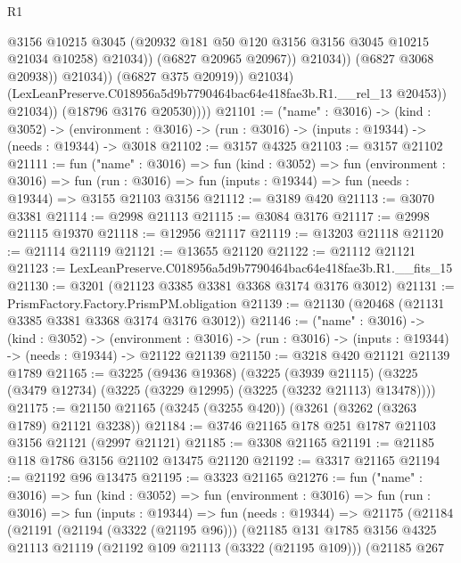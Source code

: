 \begin{lexlean}{R1}
\begin{coremodule}
                                    @3156
                                    @10215
                                    @3045
                                    (@20932 @181 @50 @120 @3156 @3156 @3045 @10215 @21034 @10258)
                                    @21034))
                                (@6827 @20965 @20967))
                              @21034))
                          (@6827 @3068 @20938))
                        @21034))
                    (@6827 @375 @20919))
                  @21034)
                (LexLeanPreserve.C018956a5d9b7790464bac64e418fae3b.R1.__rel_13 @20453))
              @21034))
          (@18796 @3176 @20530))))
@21101 := ("name" : @3016) ->
  (kind : @3052) ->
  (environment : @3016) -> (run : @3016) -> (inputs : @19344) -> (needs : @19344) -> @3018
@21102 := @3157 @4325
@21103 := @3157 @21102
@21111 := fun ("name" : @3016) =>
  fun (kind : @3052) =>
  fun (environment : @3016) =>
  fun (run : @3016) => fun (inputs : @19344) => fun (needs : @19344) => @3155 @21103 @3156
@21112 := @3189 @420
@21113 := @3070 @3381
@21114 := @2998 @21113
@21115 := @3084 @3176
@21117 := @2998 @21115 @19370
@21118 := @12956 @21117
@21119 := @13203 @21118
@21120 := @21114 @21119
@21121 := @13655 @21120
@21122 := @21112 @21121
@21123 := LexLeanPreserve.C018956a5d9b7790464bac64e418fae3b.R1.__fits_15
@21130 := @3201 (@21123 @3385 @3381 @3368 @3174 @3176 @3012)
@21131 := PrismFactory.Factory.PrismPM.obligation
@21139 := @21130 (@20468 (@21131 @3385 @3381 @3368 @3174 @3176 @3012))
@21146 := ("name" : @3016) ->
  (kind : @3052) ->
  (environment : @3016) -> (run : @3016) -> (inputs : @19344) -> (needs : @19344) -> @21122 @21139
@21150 := @3218 @420 @21121 @21139 @1789
@21165 := @3225
    (@9436 @19368)
    (@3225
      (@3939 @21115)
      (@3225 (@3479 @12734) (@3225 (@3229 @12995) (@3225 (@3232 @21113) @13478))))
@21175 := @21150 @21165 (@3245 (@3255 @420)) (@3261 (@3262 (@3263 @1789) @21121 @3238))
@21184 := @3746 @21165 @178 @251 @1787 @21103 @3156 @21121 (@2997 @21121)
@21185 := @3308 @21165
@21191 := @21185 @118 @1786 @3156 @21102 @13475 @21120
@21192 := @3317 @21165
@21194 := @21192 @96 @13475
@21195 := @3323 @21165
@21276 := fun ("name" : @3016) =>
  fun (kind : @3052) =>
  fun (environment : @3016) =>
  fun (run : @3016) =>
  fun (inputs : @19344) =>
  fun (needs : @19344) =>
  @21175
    (@21184
      (@21191
        (@21194 (@3322 (@21195 @96)))
        (@21185
          @131
          @1785
          @3156
          @4325
          @21113
          @21119
          (@21192 @109 @21113 (@3322 (@21195 @109)))
          (@21185
            @267

\end{coremodule}
\end{lexlean}
